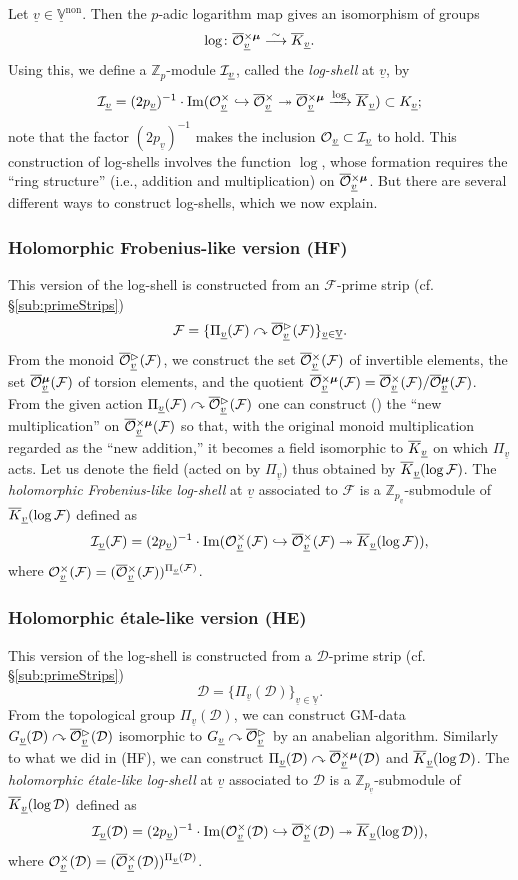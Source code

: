 \documentclass[12pt, reqno, a4paper]{amsart}
\def\udl#1{\underline{#1}} %
\def\simlongto{\stackrel{\sim}{\longrightarrow}} %
\def\acton{\curvearrowright} %
\def\surjto{\twoheadrightarrow}
\def\injto{\hookrightarrow}
\def\bZ{\mathbb{Z}} %
\def\bV{\mathbb{V}}
\def\cD{{\mathcal{D}}}
\def\cF{{\mathcal{F}}}
\def\uV{\udl{\bV}} %
\def\uv{\udl{v}} %
\DeclareMathOperator{\Image}{Im}
\def\non{\mathrm{non}}
\begin{document}
Let $\uv\in \uV^\non$. Then the $p$-adic logarithm map gives an isomorphism of groups
\[
\log\colon \oOOxmu_{\uv}\simlongto \oK_{\uv}.
\]
Using this, we define a $\bZ_p$-module $\LS_{\uv}$, called the \emph{log-shell} at $\uv$, by
\[
\LS_{\uv}=(2p_{\uv})^{-1}\cdot \Image (\OOx_{\uv}\hookrightarrow \oOOx_{\uv}\twoheadrightarrow \oOOxmu_{\uv}\xrightarrow{\log} \oK_{\uv})\subset K_{\uv};
\]
note that the factor $(2p_{\uv})^{-1}$ makes the inclusion $\OO_{\uv}\subset \LS_{\uv}$ to hold.
This construction of log-shells involves the function $\log$, whose formation requires the ``ring structure'' (i.e., addition and multiplication) on $\oOOxmu_{\uv}$.
But there are several different ways to construct log-shells, which we now explain. 


\subsubsection{Holomorphic Frobenius-like version (HF)}\label{subsub:HF}
This version of the log-shell is constructed from an $\cF$-prime strip (cf. \S\ref{sub:primeStrips})
$$
\cF=\{\Pi_{\uv}(\cF)\acton\oOOt_{\uv}(\cF)\}_{\uv\in \uV}.
$$
From the monoid $\oOOt_{\uv}(\cF)$, we construct the set $\oOOx_{\uv}(\cF)$ of invertible elements, the set $\oOOmu_{\uv}(\cF)$ of torsion elements, and the quotient $\oOOxmu_{\uv}(\cF)=\oOOx_{\uv}(\cF)/\oOOmu_{\uv}(\cF)$.
From the given action $\Pi_{\uv}(\cF)\acton\oOOt_{\uv}(\cF)$ one can construct (\cite[Prop.\ 3.2(iii),(v)]{MR3445958}) the ``new multiplication'' on $\oOOxmu_{\uv}(\cF)$ so that, with the original monoid multiplication regarded as the ``new addition,'' it becomes a field isomorphic to $\oK_{\uv}$ on which $\Pi_{\uv}$ acts.
Let us denote the field (acted on by $\Pi_{\uv}$) thus obtained by $\oK_{\uv}(\log\cF)$.
The \emph{holomorphic Frobenius-like log-shell} at $\uv$ associated to $\cF$ is a $\bZ_{p_{\uv}}$-submodule of $\oK_{\uv}(\log\cF)$ defined as
$$
\LS_{\uv}(\cF)=(2p_{\uv})^{-1}\cdot\Image(\OOx_{\uv}(\cF)\injto\oOOx_{\uv}(\cF)\surjto\oK_{\uv}(\log\cF)),
$$
where $\OOx_{\uv}(\cF)=(\oOOx_{\uv}(\cF))^{\Pi_{\uv}(\cF)}$.

\subsubsection{Holomorphic \'etale-like version (HE)}\label{subsub:HE}
This version of the log-shell is constructed from a $\cD$-prime strip (cf. \S\ref{sub:primeStrips})
$$
\cD=\{\Pi_{\uv}(\cD)\}_{\uv\in \uV}.
$$
From the topological group $\Pi_{\uv}(\cD)$, we can construct GM-data $\GG_{\uv}(\cD)\acton\oOOt_{\uv}(\cD)$ isomorphic to $\GG_{\uv}\acton\oOOt_{\uv}$ by an anabelian algorithm.
Similarly to what we did in (HF), we can construct $\Pi_{\uv}(\cD)\acton\oOOxmu_{\uv}(\cD)$ and $\oK_{\uv}(\log\cD)$.
The \emph{holomorphic \'etale-like log-shell} at $\uv$ associated to $\cD$ is a $\bZ_{p_{\uv}}$-submodule of $\oK_{\uv}(\log\cD)$ defined as
$$
\LS_{\uv}(\cD)=(2p_{\uv})^{-1}\cdot\Image(\OOx_{\uv}(\cD)\injto\oOOx_{\uv}(\cD)\surjto\oK_{\uv}(\log\cD)),
$$
where $\OOx_{\uv}(\cD)=(\oOOx_{\uv}(\cD))^{\Pi_{\uv}(\cD)}$.
\end{document}
